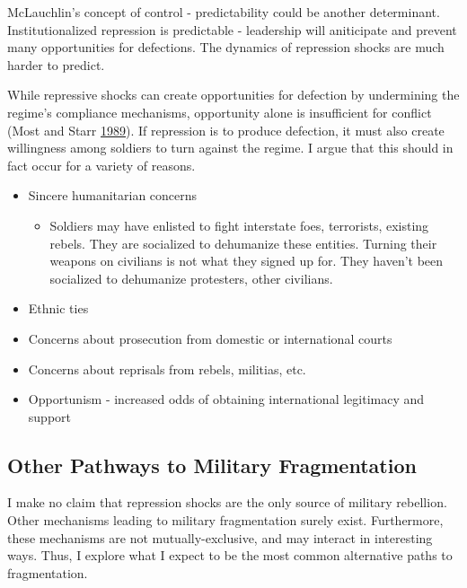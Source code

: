 \documentclass[12pt,]{article}
\providecommand{\tightlist}{%
  \setlength{\itemsep}{0pt}\setlength{\parskip}{0pt}}
\begin{document}
McLauchlin's concept of control - predictability could be another determinant. Institutionalized repression is predictable - leadership will aniticipate and prevent many opportunities for defections. The dynamics of repression shocks are much harder to predict.

While repressive shocks can create opportunities for defection by undermining the regime's compliance mechanisms, opportunity alone is insufficient for conflict (Most and Starr \protect\hyperlink{ref-Most1989}{1989}). If repression is to produce defection, it must also create willingness among soldiers to turn against the regime. I argue that this should in fact occur for a variety of reasons.

\begin{itemize}
\tightlist
\item
  Sincere humanitarian concerns

  \begin{itemize}
  \tightlist
  \item
    Soldiers may have enlisted to fight interstate foes, terrorists, existing rebels. They are socialized to dehumanize these entities. Turning their weapons on civilians is not what they signed up for. They haven't been socialized to dehumanize protesters, other civilians.
  \end{itemize}
\item
  Ethnic ties
\item
  Concerns about prosecution from domestic or international courts
\item
  Concerns about reprisals from rebels, militias, etc.
\item
  Opportunism - increased odds of obtaining international legitimacy and support
\end{itemize}

\hypertarget{other-pathways-to-military-fragmentation}{%
\subsection{Other Pathways to Military Fragmentation}\label{other-pathways-to-military-fragmentation}}

I make no claim that repression shocks are the only source of military rebellion. Other mechanisms leading to military fragmentation surely exist. Furthermore, these mechanisms are not mutually-exclusive, and may interact in interesting ways. Thus, I explore what I expect to be the most common alternative paths to fragmentation.
\end{document}
